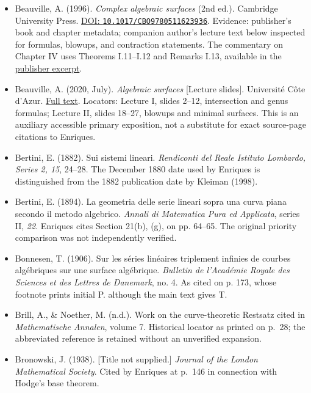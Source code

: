 \begin{sloppypar}
\begin{itemize}
\item Beauville, A. (1996). \emph{Complex algebraic surfaces} (2nd ed.). Cambridge University Press. \href{https://doi.org/10.1017/CBO9780511623936}{DOI: \nolinkurl{10.1017/CBO9780511623936}}. Evidence: publisher's book and chapter metadata; companion author's lecture text below inspected for formulas, blowups, and contraction statements. The commentary on Chapter IV uses Theorems I.11--I.12 and Remarks I.13, available in the \href{https://assets.cambridge.org/97805214/95103/excerpt/9780521495103_excerpt.pdf}{publisher excerpt}.

\item Beauville, A. (2020, July). \emph{Algebraic surfaces} {[}Lecture slides{]}. Université Côte d'Azur. \href{https://math.univ-cotedazur.fr/~beauvill/conf/Shanghai.pdf}{Full text}. Locators: Lecture I, slides 2--12, intersection and genus formulas; Lecture II, slides 18--27, blowups and minimal surfaces. This is an auxiliary accessible primary exposition, not a substitute for exact source-page citations to Enriques.

\item Bertini, E. (1882). Sui sistemi lineari. \emph{Rendiconti del Reale Istituto Lombardo, Series 2, 15}, 24--28. The December 1880 date used by Enriques is distinguished from the 1882 publication date by Kleiman (1998).

\item Bertini, E. (1894). La geometria delle serie lineari sopra una curva piana secondo il metodo algebrico. \emph{Annali di Matematica Pura ed Applicata}, series II, \emph{22}. Enriques cites Section 21(b), (g), on pp. 64--65. The original priority comparison was not independently verified.

\item Bonnesen, T. (1906). Sur les s\'eries lin\'eaires triplement infinies de courbes alg\'ebriques sur une surface alg\'ebrique. \emph{Bulletin de l'Acad\'emie Royale des Sciences et des Lettres de Danemark}, no. 4. As cited on p. 173, whose footnote prints initial P. although the main text gives T.

\item Brill, A., \& Noether, M. (n.d.). Work on the curve-theoretic Restsatz cited in \emph{Mathematische Annalen}, volume 7. Historical locator as printed on p.~28; the abbreviated reference is retained without an unverified expansion.

\item Bronowski, J. (1938). {[}Title not supplied.{]} \emph{Journal of the London Mathematical Society}. Cited by Enriques at p.~146 in connection with Hodge's base theorem.


\end{itemize}
\end{sloppypar}

